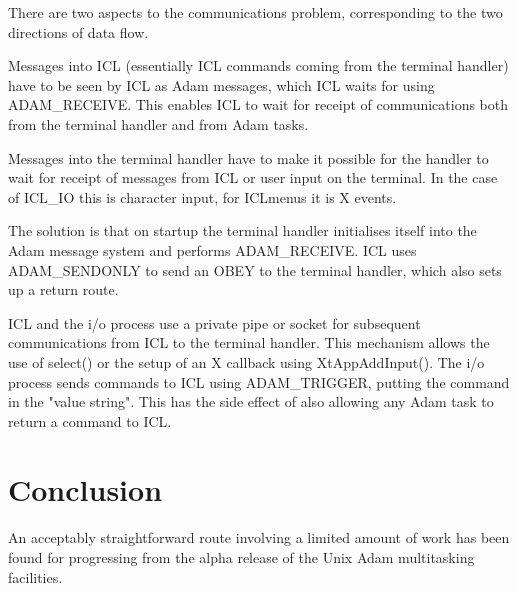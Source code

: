 There are two aspects to the communications problem, corresponding to 
the two directions of data flow.

Messages into ICL (essentially ICL commands coming from the terminal 
handler) have to be seen by ICL as Adam messages, which ICL waits for 
using ADAM\_RECEIVE. This enables ICL to wait for receipt of 
communications both from the terminal handler and from Adam tasks.

Messages into the terminal handler have to make it possible for the 
handler to wait for receipt of messages from ICL or user input on the 
terminal. In the case of ICL\_IO this is character input, for ICLmenus it 
is X events.

The solution is that on startup the terminal handler initialises itself 
into the Adam message system and performs ADAM\_RECEIVE. ICL uses 
ADAM\_SENDONLY to send an OBEY to the terminal handler, which also sets 
up a return route.

ICL and the i/o process use a private pipe or socket for subsequent
communications from ICL to the terminal handler. This mechanism allows
the use of select() or the setup of an X callback using XtAppAddInput().
The i/o process sends commands to ICL using ADAM\_TRIGGER, putting the
command in the "value string". This has the side effect of also allowing
any Adam task to return a command to ICL. 

\section {Conclusion}

An acceptably straightforward route involving a limited amount of work 
has been found for progressing from the alpha release of the Unix Adam 
multitasking facilities.


                                                                                                                                                                                                                                                                                                                                                                                              
